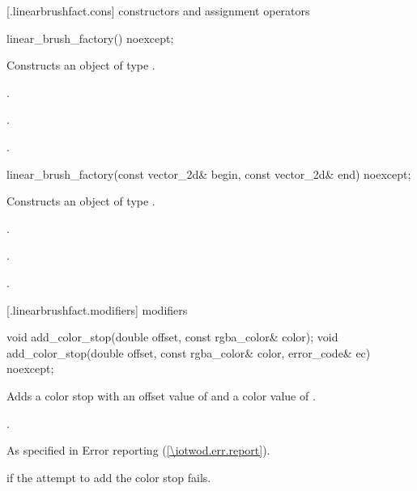  [\iotwod.linearbrushfact.cons] { constructors and assignment operators}

\begin{itemdecl}
    linear_brush_factory() noexcept;
\end{itemdecl}
\begin{itemdescr}
	\pnum
	\effects
	Constructs an object of type .
	
	\pnum
	\postconditions
	.

	\pnum
	.
	
	\pnum
	.
	
\end{itemdescr}

\begin{itemdecl}
    linear_brush_factory(const vector_2d& begin, const vector_2d& end) noexcept;
\end{itemdecl}
\begin{itemdescr}
	\pnum
	\effects
	Constructs an object of type .
	
	\pnum
	\postconditions
	.
	
	\pnum
	.
	
	\pnum
	.
	
\end{itemdescr}

 [\iotwod.linearbrushfact.modifiers] { modifiers}

\begin{itemdecl}
    void add_color_stop(double offset, const rgba_color& color);
    void add_color_stop(double offset, const rgba_color& color, 
      error_code& ec) noexcept;
\end{itemdecl}
\begin{itemdescr}
	\pnum
	\effects
	Adds a color stop with an offset value of  and a color value of .
	
	\pnum
	\postconditions
	.
	
	\pnum
	\throws
	As specified in Error reporting (\ref{\iotwod.err.report}).
	
	\pnum
	\errors
	 if the attempt to add the color stop fails.
	
\end{itemdescr}

